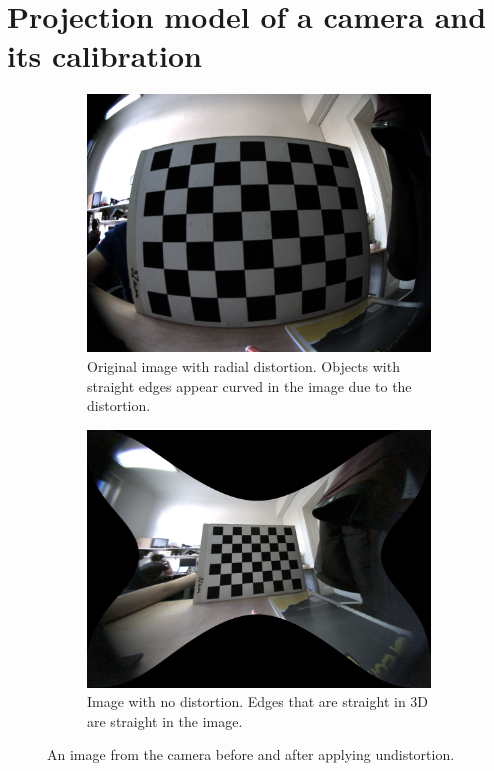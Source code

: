\section{Projection model of a camera and its calibration}
\label{sec:meth_calib}
\begin{figure}[h]
    \begin{subfigure}[t]{0.45\textwidth}
      \includegraphics[width=\textwidth]{graphics/chessboard_img.png}
      \caption{Original image with radial distortion. Objects with straight edges appear curved in the image due to the distortion.}
      \label{fig:chb1}
    \end{subfigure}
    \hfill
    \begin{subfigure}[t]{0.45\textwidth}
      \includegraphics[width=\textwidth]{graphics/chessboard_img_rect.png}
      \caption{Image with no distortion. Edges that are straight in 3D are straight in the image.}
      \label{fig:chb2}
    \end{subfigure}
    \caption{An image from the camera before and after applying undistortion.}
    \label{fig:chb}
\end{figure}

